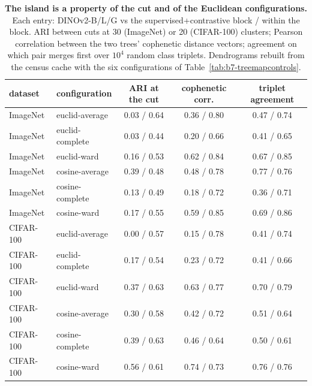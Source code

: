 \begin{table}[H]
\centering
\small
\setlength{\tabcolsep}{4pt}
\begin{tabular}{llccc}
\toprule
dataset & configuration & ARI at the cut & cophenetic corr. & triplet agreement \\
\midrule
ImageNet & euclid-average & 0.03 / 0.64 & 0.36 / 0.80 & 0.47 / 0.74 \\
ImageNet & euclid-complete & 0.03 / 0.44 & 0.20 / 0.66 & 0.41 / 0.65 \\
ImageNet & euclid-ward & 0.16 / 0.53 & 0.62 / 0.84 & 0.67 / 0.85 \\
ImageNet & cosine-average & 0.39 / 0.48 & 0.48 / 0.78 & 0.77 / 0.76 \\
ImageNet & cosine-complete & 0.13 / 0.49 & 0.18 / 0.72 & 0.36 / 0.71 \\
ImageNet & cosine-ward & 0.17 / 0.55 & 0.59 / 0.85 & 0.69 / 0.86 \\
CIFAR-100 & euclid-average & 0.00 / 0.57 & 0.15 / 0.78 & 0.41 / 0.74 \\
CIFAR-100 & euclid-complete & 0.17 / 0.54 & 0.23 / 0.72 & 0.41 / 0.66 \\
CIFAR-100 & euclid-ward & 0.37 / 0.63 & 0.63 / 0.77 & 0.70 / 0.79 \\
CIFAR-100 & cosine-average & 0.30 / 0.58 & 0.42 / 0.72 & 0.51 / 0.64 \\
CIFAR-100 & cosine-complete & 0.39 / 0.63 & 0.46 / 0.64 & 0.50 / 0.61 \\
CIFAR-100 & cosine-ward & 0.56 / 0.61 & 0.74 / 0.73 & 0.76 / 0.76 \\
\bottomrule
\end{tabular}
\caption{\textbf{The island is a property of the cut and of the Euclidean configurations.} Each entry: DINOv2-B/L/G vs the supervised+contrastive block / within the block. ARI between cuts at 30 (ImageNet) or 20 (CIFAR-100) clusters; Pearson correlation between the two trees' cophenetic distance vectors; agreement on which pair merges first over $10^4$ random class triplets. Dendrograms rebuilt from the census cache with the six configurations of Table~\ref{tab:b7-treemapcontrols}. %
}
\label{tab:b33-cutfree}
\end{table}
